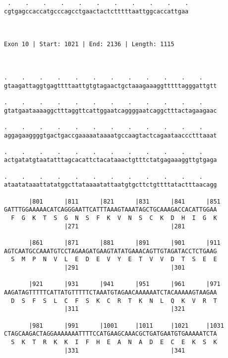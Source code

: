\documentclass{article}
\begin{document}
\begin{Verbatim}
 .    .    .    .    .    .    .    .    .    .    .
cgtgagccaccatgcccagcctgaactactctttttaattggcaccattgaa
                                                    
                                                    
 
Exon 10 | Start: 1021 | End: 2136 | Length: 1115



.    .    .    .    .    .    .    .    .    .    .    .    
gtaagattaggtgagttttaattgtgtagaactgctaaagaaaggtttttagggattgtt
                                                            
.    .    .    .    .    .    .    .    .    .    .    .    
gtatgaataaaaggctttaggttcattggaatcaggggaatcaggctttactagaagaac
                                                            
.    .    .    .    .    .    .    .    .    .    .    .    
aggagaaggggtgactgaccgaaaaataaaatgccaagtactcagaataaccctttaaat
                                                            
.    .    .    .    .    .    .    .    .    .    .    .    
actgatatgtaatatttagcacattctacataaactgtttctatgagaaaggttgtgaga
                                                            
.    .    .    .    .    .    .    .    .    .    .    .    
ataatataaattatatggcttataaaatattaatgtgcttctgttttatactttaacagg
                                                            
       |801      |811      |821      |831      |841      |851
GATTTGGAAAAACATCAGGGAATTCATTTAAAGTAAATAGCTGCAAAGACCACATTGGAA
  F  G  K  T  S  G  N  S  F  K  V  N  S  C  K  D  H  I  G  K
                 |271                          |281         
  
       |861      |871      |881      |891      |901      |911
AGTCAATGCCAAATGTCCTAGAAGATGAAGTATATGAAACAGTTGTAGATACCTCTGAAG
  S  M  P  N  V  L  E  D  E  V  Y  E  T  V  V  D  T  S  E  E
                 |291                          |301         
  
       |921      |931      |941      |951      |961      |971
AAGATAGTTTTTCATTATGTTTTTCTAAATGTAGAACAAAAAATCTACAAAAAGTAAGAA
  D  S  F  S  L  C  F  S  K  C  R  T  K  N  L  Q  K  V  R  T
                 |311                          |321         
  
       |981      |991      |1001     |1011     |1021     |1031
CTAGCAAGACTAGGAAAAAAATTTTCCATGAAGCAAACGCTGATGAATGTGAAAAATCTA
  S  K  T  R  K  K  I  F  H  E  A  N  A  D  E  C  E  K  S  K
                 |331                          |341         
  

\end{Verbatim}
\end{document}
